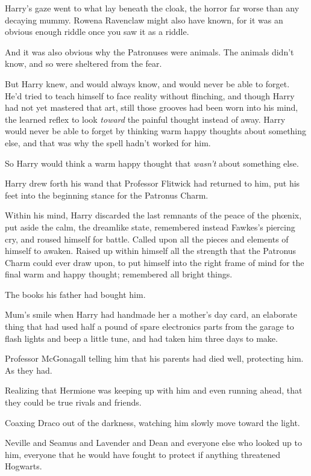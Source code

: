 Harry's gaze went to what lay beneath the cloak, the horror far worse than any decaying mummy. Rowena Ravenclaw might also have known, for it was an obvious enough riddle once you saw it as a riddle.

And it was also obvious why the Patronuses were animals. The animals didn't know, and so were sheltered from the fear.

But Harry knew, and would always know, and would never be able to forget. He'd tried to teach himself to face reality without flinching, and though Harry had not yet mastered that art, still those grooves had been worn into his mind, the learned reflex to look \emph{toward} the painful thought instead of away. Harry would never be able to forget by thinking warm happy thoughts about something else, and that was why the spell hadn't worked for him.

So Harry would think a warm happy thought that \emph{wasn't} about something else.

Harry drew forth his wand that Professor Flitwick had returned to him, put his feet into the beginning stance for the Patronus Charm.

Within his mind, Harry discarded the last remnants of the peace of the phœnix, put aside the calm, the dreamlike state, remembered instead Fawkes's piercing cry, and roused himself for battle. Called upon all the pieces and elements of himself to awaken. Raised up within himself all the strength that the Patronus Charm could ever draw upon, to put himself into the right frame of mind for the final warm and happy thought; remembered all bright things.

The books his father had bought him.

Mum's smile when Harry had handmade her a mother's day card, an elaborate thing that had used half a pound of spare electronics parts from the garage to flash lights and beep a little tune, and had taken him three days to make.

Professor McGonagall telling him that his parents had died well, protecting him. As they had.

Realizing that Hermione was keeping up with him and even running ahead, that they could be true rivals and friends.

Coaxing Draco out of the darkness, watching him slowly move toward the light.

Neville and Seamus and Lavender and Dean and everyone else who looked up to him, everyone that he would have fought to protect if anything threatened Hogwarts.

